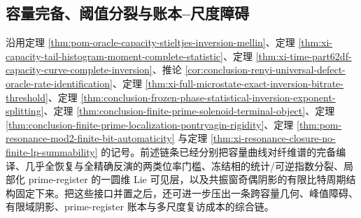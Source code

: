 \subsection{容量完备、阈值分裂与账本--尺度障碍}\label{subsec:conclusion-capacity-threshold-shadow-ledger-scale-obstruction}
沿用定理 \ref{thm:pom-oracle-capacity-stieltjes-inversion-mellin}、定理 \ref{thm:xi-capacity-tail-histogram-moment-complete-statistic}、定理 \ref{thm:xi-time-part62df-capacity-curve-complete-inversion}、推论 \ref{cor:conclusion-renyi-universal-defect-oracle-rate-identification}、定理 \ref{thm:xi-full-microstate-exact-inversion-bitrate-threshold}、定理 \ref{thm:conclusion-frozen-phase-statistical-inversion-exponent-splitting}、定理 \ref{thm:conclusion-finite-prime-solenoid-terminal-object}、定理 \ref{thm:conclusion-finite-prime-localization-pontryagin-rigidity}、定理 \ref{thm:pom-resonance-mod2-finite-bit-automaticity} 与定理 \ref{thm:xi-resonance-closure-no-finite-lp-summability} 的记号。前述链条已经分别把容量曲线对纤维谱的完备编译、几乎全恢复与全精确反演的两类位率门槛、冻结相的统计/可逆指数分裂、局部化 prime-register 的一圆维 Lie 可见层，以及共振窗奇偶阴影的有限比特周期结构固定下来。把这些接口并置之后，还可进一步压出一条跨容量几何、峰值障碍、有限域阴影、prime-register 账本与多尺度复访成本的综合链。


